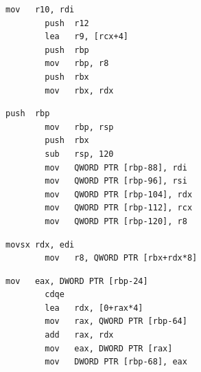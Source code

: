 

\begin{table}[!ht]
\centering
\begin{minipage}[t]{.48\textwidth}
    \begin{lstlisting}[style=cleanasm,caption={Optimised Function Entry}]
        mov   r10, rdi
        push  r12
        lea   r9, [rcx+4]
        push  rbp
        mov   rbp, r8
        push  rbx
        mov   rbx, rdx
    \end{lstlisting}
\end{minipage}
\hfill
\begin{minipage}[t]{.48\textwidth}
    \begin{lstlisting}[style=cleanasm,caption={Un-Optimised Function Entry}]
        push  rbp
        mov   rbp, rsp
        push  rbx
        sub   rsp, 120
        mov   QWORD PTR [rbp-88], rdi
        mov   QWORD PTR [rbp-96], rsi
        mov   QWORD PTR [rbp-104], rdx
        mov   QWORD PTR [rbp-112], rcx
        mov   QWORD PTR [rbp-120], r8
    \end{lstlisting}
\end{minipage}

\vspace{0.5em} 

\begin{minipage}[t]{.48\textwidth}
    \begin{lstlisting}[style=cleanasm,caption={Optimised Variable Access}]
        movsx rdx, edi
        mov   r8, QWORD PTR [rbx+rdx*8]
    \end{lstlisting}
\end{minipage}
\hfill
\begin{minipage}[t]{.48\textwidth}
    \begin{lstlisting}[style=cleanasm,caption={Un-Optimised Variable Access}]
        mov   eax, DWORD PTR [rbp-24]
        cdqe
        lea   rdx, [0+rax*4]
        mov   rax, QWORD PTR [rbp-64]
        add   rax, rdx
        mov   eax, DWORD PTR [rax]
        mov   DWORD PTR [rbp-68], eax
    \end{lstlisting}
\end{minipage}

\caption{Comparison between optimised and un-optimised function setup and variable access. Generated using Compiler Explorer \cite{godbolt_compiler_nodate}.}
\label{tab:asm_opt_comparison}
\end{table}